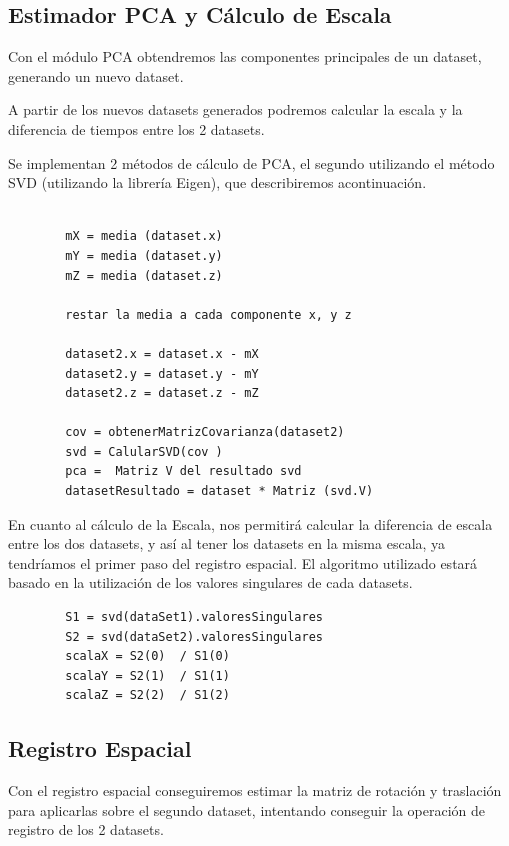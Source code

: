 \subsection{Estimador PCA y Cálculo de Escala}

	Con el módulo PCA obtendremos las componentes principales de un dataset, generando un nuevo dataset.

	A partir de los nuevos datasets generados podremos calcular la escala y la diferencia de tiempos entre los 2 datasets.

	Se implementan 2 métodos de cálculo de PCA, el segundo utilizando el método SVD (utilizando la librería Eigen), que describiremos acontinuación.

	\begin{lstlisting}
		
		mX = media (dataset.x)
		mY = media (dataset.y)
		mZ = media (dataset.z)

		restar la media a cada componente x, y z

		dataset2.x = dataset.x - mX
		dataset2.y = dataset.y - mY
		dataset2.z = dataset.z - mZ

		cov = obtenerMatrizCovarianza(dataset2)
		svd = CalularSVD(cov )
		pca =  Matriz V del resultado svd
		datasetResultado = dataset * Matriz (svd.V)

	\end{lstlisting}

    En cuanto al cálculo de la Escala, nos permitirá calcular la diferencia de escala entre los dos datasets, y así al tener los datasets en la misma escala, ya tendríamos el primer paso del registro espacial. El algoritmo utilizado estará basado en la utilización de los valores singulares de cada datasets.
        
	\begin{lstlisting}
		S1 = svd(dataSet1).valoresSingulares
		S2 = svd(dataSet2).valoresSingulares
		scalaX = S2(0)  / S1(0)
		scalaY = S2(1)  / S1(1)
		scalaZ = S2(2)  / S1(2)
	\end{lstlisting}

\subsection{Registro Espacial}

Con el registro espacial conseguiremos estimar la matriz de rotación y traslación para aplicarlas sobre el segundo dataset, intentando conseguir la operación de registro de los 2 datasets.




